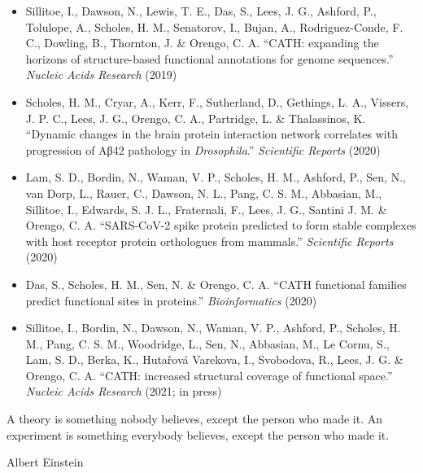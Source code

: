 \begin{itemize}
    \item Sillitoe, I., Dawson, N., Lewis, T. E., Das, S., Lees, J. G., Ashford, P., Tolulope, A., Scholes, H. M., Senatorov, I., Bujan, A., Rodriguez-Conde, F. C., Dowling, B., Thornton, J. \& Orengo, C. A. ``CATH: expanding the horizons of structure-based functional annotations for genome sequences.'' \textit{Nucleic Acids Research} (2019)
    \item Scholes, H. M., Cryar, A., Kerr, F., Sutherland, D., Gethings, L. A., Vissers, J. P. C., Lees, J. G., Orengo, C. A., Partridge, L. \& Thalassinos, K. ``Dynamic changes in the brain protein interaction network correlates with progression of Aβ42 pathology in \textit{Drosophila}.'' \textit{Scientific Reports} (2020)
    \item Lam, S. D., Bordin, N., Waman, V. P., Scholes, H. M., Ashford, P., Sen, N., van Dorp, L., Rauer, C., Dawson, N. L., Pang, C. S. M., Abbasian, M., Sillitoe, I., Edwards, S. J. L., Fraternali, F., Lees, J. G., Santini J. M. \& Orengo, C. A. ``SARS-CoV-2 spike protein predicted to form stable complexes with host receptor protein orthologues from mammals.'' \textit{Scientific Reports} (2020)
    \item Das, S., Scholes, H. M., Sen, N. \& Orengo, C. A. ``CATH functional families predict functional sites in proteins.'' \textit{Bioinformatics} (2020)
    \item Sillitoe, I., Bordin, N., Dawson, N., Waman, V. P., Ashford, P., Scholes, H. M., Pang, C. S. M., Woodridge, L., Sen, N., Abbasian, M., Le Cornu, S., Lam, S. D., Berka, K., Hutařová Varekova, I., Svobodova, R., Lees, J. G. \& Orengo, C. A. ``CATH: increased structural coverage of functional space.'' \textit{Nucleic Acids Research} (2021; in press)
\end{itemize}

\cleardoublepage
{}%
\setlength{\epigraphwidth}{0.6\textwidth}
\thispagestyle{empty}
\epigraph{A theory is something nobody believes, except the person who made it. An experiment is something everybody believes, except the person who made it.}{Albert Einstein}
\cleardoublepage